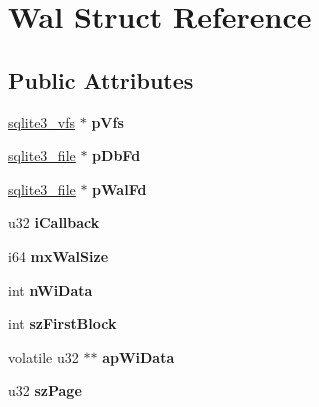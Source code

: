 \hypertarget{struct_wal}{}\section{Wal Struct Reference}
\label{struct_wal}
\subsection*{Public Attributes}
\begin{DoxyCompactItemize}
\item 
\mbox{\label{struct_wal_a5431b060acbc998a7e3710587abaa11e}} 
\mbox{\hyperlink{structsqlite3__vfs}{sqlite3\+\_\+vfs}} $\ast$ {\bfseries p\+Vfs}
\item 
\mbox{\label{struct_wal_a3a4d051c55228e554b36691c5095ed14}} 
\mbox{\hyperlink{structsqlite3__file}{sqlite3\+\_\+file}} $\ast$ {\bfseries p\+Db\+Fd}
\item 
\mbox{\label{struct_wal_aea2a72ead42cfe57e3a6809e80884397}} 
\mbox{\hyperlink{structsqlite3__file}{sqlite3\+\_\+file}} $\ast$ {\bfseries p\+Wal\+Fd}
\item 
\mbox{\label{struct_wal_aae230a2317817739a5f08ebb28b644b0}} 
u32 {\bfseries i\+Callback}
\item 
\mbox{\label{struct_wal_a413f9f82c15d31627a2ed6eac9b6cc27}} 
i64 {\bfseries mx\+Wal\+Size}
\item 
\mbox{\label{struct_wal_ae3e69420adab92acd90dd7c03d37815f}} 
int {\bfseries n\+Wi\+Data}
\item 
\mbox{\label{struct_wal_a901c02626270f4d51db89786e4994da9}} 
int {\bfseries sz\+First\+Block}
\item 
\mbox{\label{struct_wal_a2b0078e3adfd1fb21794561bb12bbfac}} 
volatile u32 $\ast$$\ast$ {\bfseries ap\+Wi\+Data}
\item 
\mbox{\label{struct_wal_a771c3a8c81326babc7d623255a6034c5}} 
u32 {\bfseries sz\+Page}
\item 
\mbox{\label{struct_wal_a260550c859ac7224fbdad0586dca664a}} 
$$
\end{DoxyCompactItemize}
